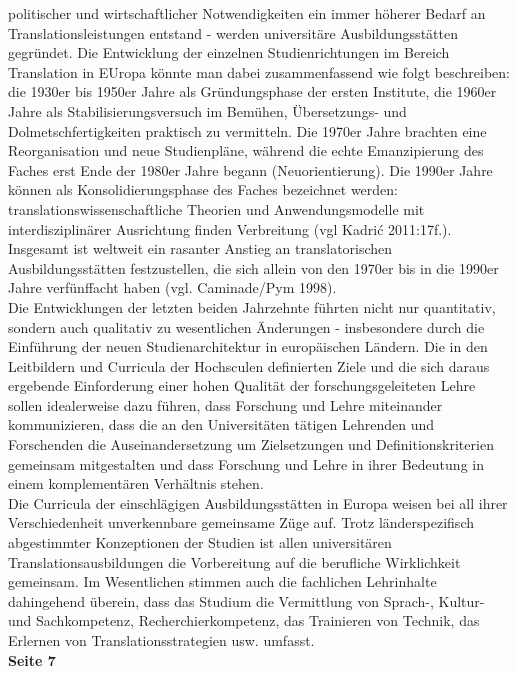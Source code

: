 \documentclass{article}
\begin{document}
	politischer und wirtschaftlicher Notwendigkeiten ein immer höherer Bedarf an Translationsleistungen entstand - werden universitäre Ausbildungsstätten gegründet. Die Entwicklung der einzelnen Studienrichtungen im Bereich Translation in EUropa könnte man dabei zusammenfassend wie folgt beschreiben: die 1930er bis 1950er Jahre als Gründungsphase der ersten Institute, die 1960er Jahre als Stabilisierungsversuch im Bemühen, Übersetzungs- und Dolmetschfertigkeiten \glqq praktisch\grqq \: zu vermitteln. Die 1970er Jahre brachten eine Reorganisation und neue Studienpläne, während die echte Emanzipierung des Faches erst Ende der 1980er Jahre begann (\glqq Neuorientierung\grqq). Die 1990er Jahre können als Konsolidierungsphase des Faches bezeichnet werden: translationswissenschaftliche Theorien und Anwendungsmodelle mit interdisziplinärer Ausrichtung finden Verbreitung (vgl Kadrić 2011:17f.). Insgesamt ist weltweit ein rasanter Anstieg an translatorischen Ausbildungsstätten festzustellen, die sich allein von den 1970er bis in die 1990er Jahre verfünffacht haben (vgl. Caminade/Pym 1998). \\
	Die Entwicklungen der letzten beiden Jahrzehnte führten nicht nur quantitativ, sondern auch qualitativ zu wesentlichen Änderungen - insbesondere durch die Einführung der neuen Studienarchitektur in europäischen Ländern. Die in den Leitbildern und Curricula der Hochsculen definierten Ziele und die sich daraus ergebende Einforderung einer hohen Qualität der forschungsgeleiteten Lehre sollen idealerweise dazu führen, dass Forschung und Lehre miteinander kommunizieren, dass die an den Universitäten tätigen Lehrenden und Forschenden die Auseinandersetzung um Zielsetzungen und Definitionskriterien gemeinsam mitgestalten und dass Forschung und Lehre in ihrer Bedeutung in einem komplementären Verhältnis stehen. \\
	Die Curricula der einschlägigen Ausbildungsstätten in Europa weisen bei all ihrer Verschiedenheit unverkennbare gemeinsame Züge auf. Trotz länderspezifisch abgestimmter Konzeptionen der Studien ist allen universitären Translationsausbildungen die Vorbereitung auf die berufliche Wirklichkeit gemeinsam. Im Wesentlichen stimmen auch die fachlichen Lehrinhalte dahingehend überein, dass das Studium die Vermittlung von Sprach-, Kultur- und Sachkompetenz, Recherchierkompetenz, das Trainieren von Technik, das Erlernen von Translationsstrategien usw. umfasst. \\
	\textbf{Seite 7} \\
\end{document}
